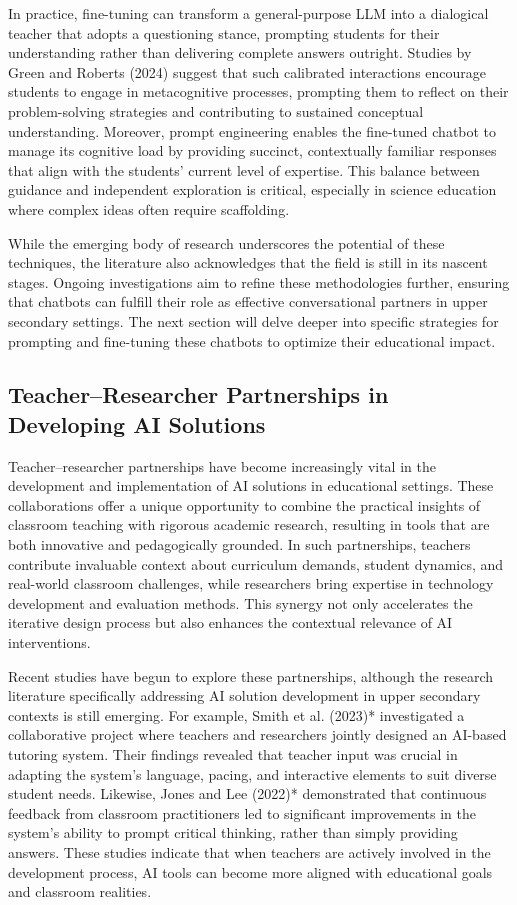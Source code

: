 \documentclass[pdflatex,sn-apa]{sn-jnl}%
\theoremstyle{thmstyleone}%
\theoremstyle{thmstyletwo}%
\theoremstyle{thmstylethree}%
\begin{document}
In practice, fine-tuning can transform a general-purpose LLM into a dialogical teacher that adopts a questioning stance, prompting students for their understanding rather than delivering complete answers outright. Studies by Green and Roberts (2024) suggest that such calibrated interactions encourage students to engage in metacognitive processes, prompting them to reflect on their problem-solving strategies and contributing to sustained conceptual understanding. Moreover, prompt engineering enables the fine-tuned chatbot to manage its cognitive load by providing succinct, contextually familiar responses that align with the students' current level of expertise. This balance between guidance and independent exploration is critical, especially in science education where complex ideas often require scaffolding.

While the emerging body of research underscores the potential of these techniques, the literature also acknowledges that the field is still in its nascent stages. Ongoing investigations aim to refine these methodologies further, ensuring that chatbots can fulfill their role as effective conversational partners in upper secondary settings. The next section will delve deeper into specific strategies for prompting and fine-tuning these chatbots to optimize their educational impact.

\subsection{Teacher–Researcher Partnerships in Developing AI Solutions}
Teacher–researcher partnerships have become increasingly vital in the development and implementation of AI solutions in educational settings. These collaborations offer a unique opportunity to combine the practical insights of classroom teaching with rigorous academic research, resulting in tools that are both innovative and pedagogically grounded. In such partnerships, teachers contribute invaluable context about curriculum demands, student dynamics, and real-world classroom challenges, while researchers bring expertise in technology development and evaluation methods. This synergy not only accelerates the iterative design process but also enhances the contextual relevance of AI interventions.

Recent studies have begun to explore these partnerships, although the research literature specifically addressing AI solution development in upper secondary contexts is still emerging. For example, Smith et al. (2023)* investigated a collaborative project where teachers and researchers jointly designed an AI-based tutoring system. Their findings revealed that teacher input was crucial in adapting the system’s language, pacing, and interactive elements to suit diverse student needs. Likewise, Jones and Lee (2022)* demonstrated that continuous feedback from classroom practitioners led to significant improvements in the system’s ability to prompt critical thinking, rather than simply providing answers. These studies indicate that when teachers are actively involved in the development process, AI tools can become more aligned with educational goals and classroom realities.
\end{document}
